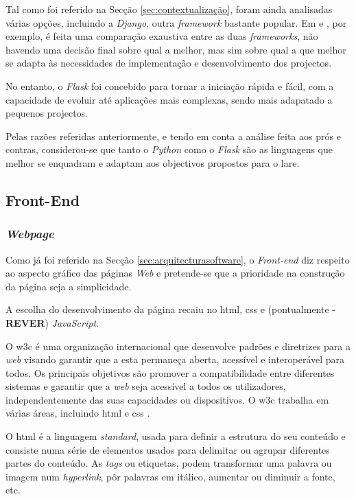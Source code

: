 Tal como foi referido na Secção \ref{sec:contextualização}, foram ainda analisadas várias opções, incluindo a \textit{Django}, outra \textit{framework} bastante popular. Em \cite{Djangovsflask} e \cite{FlaskvsDjango}, por exemplo, é feita uma comparação exaustiva entre as duas \textit{frameworks}, não havendo uma decisão final sobre qual a melhor, mas sim sobre qual a que melhor se adapta às necessidades de implementação e desenvolvimento dos projectos.

No entanto, o \textit{Flask} foi concebido para tornar a iniciação rápida e fácil, com a capacidade de evoluir até aplicações mais complexas, sendo mais adapatado a pequenos projectos.

Pelas razões referidas anteriormente, e tendo em conta a análise feita aos prós e contras, considerou-se que tanto o \textit{Python} como o \textit{Flask} são as linguagens que melhor se enquadram e adaptam aos objectivos propostos para o \acrshort{lare}.

\subsection{Front-End}
\label{sec:frontend}
\subsubsection{\textit{Webpage}}
Como já foi referido na Secção \ref{sec:arquitecturasoftware}, o \textit{Front-end} diz respeito ao aspecto gráfico das páginas \textit{Web} e pretende-se que a prioridade na construção da página seja a simplicidade.

A escolha do desenvolvimento da página recaiu no \acrshort{html}, \acrshort{css} e (pontualmente - \textbf{REVER}) \textit{JavaScript}.

O \acrfull{w3c} é uma organização internacional que desenvolve padrões e diretrizes para a \textit{web} visando garantir que a esta permaneça aberta, acessível e interoperável para todos. Os principais objetivos são promover a compatibilidade entre diferentes sistemas e garantir que a \textit{web} seja acessível a todos os utilizadores, independentemente das suas capacidades ou dispositivos. O \acrshort{w3c} trabalha em várias áreas, incluindo \acrshort{html} e \acrshort{css} \cite{W3C}.

O \acrshort{html} é a linguagem \textit{standard}, usada para definir a estrutura do seu conteúdo e consiste numa série de elementos usados para delimitar ou agrupar diferentes partes do conteúdo. As \textit{tags} ou etiquetas, podem transformar uma palavra ou imagem num \textit{hyperlink}, pôr palavras em itálico, aumentar ou diminuir a fonte, etc. \cite{HTMLbasics}

